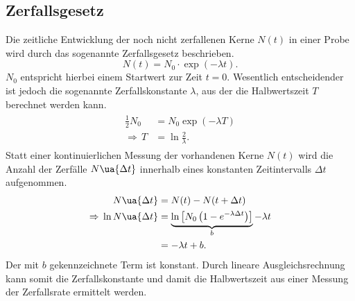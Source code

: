 \subsection{Zerfallsgesetz}
Die zeitliche Entwicklung der noch nicht zerfallenen Kerne $N(t)$ in einer Probe wird durch das sogenannte
Zerfallsgesetz beschrieben.
\begin{equation}
  N(t) = N_0 \cdot \exp\left(-\lambda t  \right).
  \label{eq: zerfallsgesetz}
\end{equation}
$N_0$ entspricht hierbei einem Startwert zur Zeit $t = 0$. Wesentlich entscheidender ist jedoch die sogenannte Zerfallskonstante $\lambda$,
aus der die Halbwertszeit $T$ berechnet werden kann.
\begin{align}
  \begin{aligned}
    \frac{1}{2} N_0 &= N_0 \exp\left(-\lambda T \right) \\
    \Rightarrow \, T &= \ln\frac{2}{\lambda}.
  \end{aligned}
  \label{eq: halbwertszeit}
\end{align}
Statt einer kontinuierlichen Messung der vorhandenen Kerne $N(t)$ wird die Anzahl der Zerfälle $N\ua{\Delta t}$ innerhalb eines
konstanten Zeitintervalls $\Delta t$ aufgenommen.
\begin{align}
  N\ua{\Delta t} &= N(t) - N(t + \Delta t) \\
  \Rightarrow \, \ln N\ua{\Delta t} &= \underbrace{\ln\left[N_0\left(1 - e^{-\lambda \Delta t} \right) \right]}_{b} - \lambda t\\
  &= -\lambda t + b.
\end{align}
Der mit $b$ gekennzeichnete Term ist konstant. Durch lineare Ausgleichsrechnung kann somit die Zerfallskonstante und damit die
Halbwertszeit aus einer Messung der Zerfallsrate ermittelt werden.
